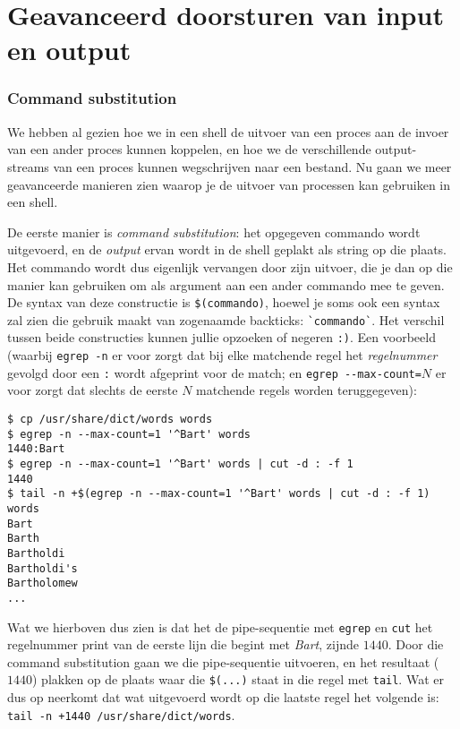 \documentclass[a4paper,twoside,openany]{memoir}
\begin{document}
\chapter{Geavanceerd doorsturen van input en output}
\subsection{Command substitution}

We hebben al gezien hoe we in een shell de uitvoer van een proces aan de invoer
van een ander proces kunnen koppelen, en hoe we de verschillende output-streams
van een proces kunnen wegschrijven naar een bestand. Nu gaan we meer
geavanceerde manieren zien waarop je de uitvoer van processen kan gebruiken in
een shell.

De eerste manier is \emph{command substitution}: het opgegeven commando wordt
uitgevoerd, en de \emph{output} ervan wordt in de shell geplakt als string op
die plaats. Het commando wordt dus eigenlijk vervangen door zijn uitvoer, die
je dan op die manier kan gebruiken om als argument aan een ander commando mee
te geven. De syntax van deze constructie is \verb!$(commando)!, hoewel je soms
ook een syntax zal zien die gebruik maakt van zogenaamde backticks:
\verb!`commando`!. Het verschil tussen beide constructies kunnen jullie
opzoeken of negeren \verb!:)!. Een voorbeeld (waarbij \verb!egrep -n! er voor
zorgt dat bij elke matchende regel het \emph{regelnummer} gevolgd door een
\verb!:! wordt afgeprint voor de match; en \verb!egrep --max-count=!$N$ er voor
zorgt dat slechts de eerste $N$ matchende regels worden teruggegeven):

\begin{verbatim}
$ cp /usr/share/dict/words words
$ egrep -n --max-count=1 '^Bart' words
1440:Bart
$ egrep -n --max-count=1 '^Bart' words | cut -d : -f 1
1440
$ tail -n +$(egrep -n --max-count=1 '^Bart' words | cut -d : -f 1) words
Bart
Barth
Bartholdi
Bartholdi's
Bartholomew
...
\end{verbatim}

Wat we hierboven dus zien is dat het de pipe-sequentie met \verb!egrep! en
\verb!cut! het regelnummer print van de eerste lijn die begint met \emph{Bart},
zijnde $1440$. Door die command substitution gaan we die pipe-sequentie
uitvoeren, en het resultaat ($1440$) plakken op de plaats waar die
\verb!$(...)! staat in die regel met \verb!tail!. Wat er dus op neerkomt dat
wat uitgevoerd wordt op die laatste regel het volgende is: \verb!tail -n +1440 /usr/share/dict/words!.
\end{document}
